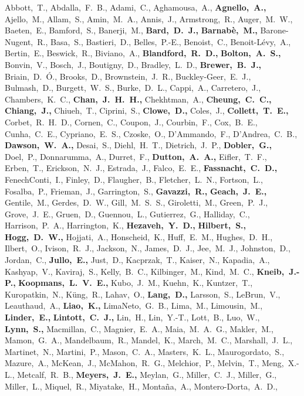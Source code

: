\scriptsize
Abbott,~T.,
Abdalla,~F.~B.,
Adami,~C.,
Aghamousa,~A.,
{\bf Agnello,~A.,}
Ajello,~M.,
Allam,~S.,
Amin,~M.~A.,
Annis,~J.,
Armstrong,~R.,
Auger,~M.~W.,
Baeten,~E.,
Bamford,~S.,
Banerji,~M.,
{\bf Bard,~D.~J.,}
{\bf Barnab\`{e},~M.,}
Barone-Nugent,~R.,
Basa,~S.,
Bastieri,~D.,
Belles,~P.-E.,
Benoist,~C.,
Benoit-L\'{e}vy,~A.,
Bertin,~E.,
Beswick,~R.,
Biviano,~A.,
{\bf Blandford,~R.~D.,}
{\bf Bolton,~A.~S.,}
Bonvin,~V.,
Bosch,~J.,
Boutigny,~D.,
Bradley,~L.~D.,
{\bf Brewer,~B.~J.,}
Briain,~D.~\'{O}.,
Brooks,~D.,
Brownstein,~J.~R.,
Buckley-Geer,~E.~J.,
Bulmash,~D.,
Burgett,~W.~S.,
Burke,~D.~L.,
Cappi,~A.,
Carretero,~J.,
Chambers,~K.~C.,
{\bf Chan,~J.~H.~H.,}
Chekhtman,~A.,
{\bf Cheung,~C.~C.,}
{\bf Chiang,~J.,}
Chiueh,~T.,
Ciprini,~S.,
{\bf Clowe,~D.,}
Coles,~J.,
{\bf Collett,~T.~E.,}
Corbet,~R.~H.~D.,
Cornen,~C.,
Coupon,~J.,
Courbin,~F.,
Cox,~B.~E.,
Cunha,~C.~E.,
Cypriano,~E.~S.,
Czoske,~O.,
D'Ammando,~F.,
D'Andrea,~C.~B.,
{\bf Dawson,~W.~A.,}
Desai,~S.,
Diehl,~H.~T.,
Dietrich,~J.~P.,
{\bf Dobler,~G.,}
Doel,~P.,
Donnarumma,~A.,
Durret,~F.,
{\bf Dutton,~A.~A.,}
Eifler,~T.~F.,
Erben,~T.,
Erickson,~N.~J.,
Estrada,~J.,
Falco,~E.~E.,
{\bf Fassnacht,~C.~D.,}
FenechConti,~I.,
Finley,~D.,
Flaugher,~B.,
Fletcher,~L.~N.,
Fortson,~L.,
Fosalba,~P.,
Frieman,~J.,
Garrington,~S.,
{\bf Gavazzi,~R.,}
{\bf Geach,~J.~E.,}
Gentile,~M.,
Gerdes,~D.~W.,
Gill,~M.~S.~S.,
Giroletti,~M.,
Green,~P.~J.,
Grove,~J.~E.,
Gruen,~D.,
Guennou,~L.,
Gutierrez,~G.,
Halliday,~C.,
Harrison,~P.~A.,
Harrington,~K.,
{\bf Hezaveh,~Y.~D.,}
{\bf Hilbert,~S.,}
{\bf Hogg,~D.~W.,}
Hojjati,~A.,
Honscheid,~K.,
Huff,~E.~M.,
Hughes,~D.~H.,
Ilbert,~O.,
Ivison,~R.~J.,
Jackson,~N.,
James,~D.~J.,
Jee,~M.~J.,
Johnston,~D.,
Jordan,~C.,
{\bf Jullo,~E.,}
Just,~D.,
Kacprzak,~T.,
Kaiser,~N.,
Kapadia,~A.,
Kashyap,~V.,
Kaviraj,~S.,
Kelly,~B.~C.,
Kilbinger,~M.,
Kind,~M.~C.,
{\bf Kneib,~J.-P.,}
{\bf Koopmans,~L.~V.~E.,}
Kubo,~J.~M.,
Kuehn,~K.,
Kuntzer,~T.,
Kuropatkin,~N.,
K\"{u}ng,~R.,
Lahav,~O.,
{\bf Lang,~D.,}
Larsson,~S.,
LeBrun,~V.,
Leauthaud,~A.,
{\bf Liao,~K.,}
LimaNeto,~G.~B.,
Lima,~M.,
Limousin,~M.,
{\bf Linder,~E.,}
{\bf Lintott,~C.~J.,}
Lin,~H.,
Lin,~Y.-T.,
Lott,~B.,
Luo,~W.,
{\bf Lynn,~S.,}
Macmillan,~C.,
Magnier,~E.~A.,
Maia,~M.~A.~G.,
Makler,~M.,
Mamon,~G.~A.,
Mandelbaum,~R.,
Mandel,~K.,
March,~M.~C.,
Marshall,~J.~L.,
Martinet,~N.,
Martini,~P.,
Mason,~C.~A.,
Masters,~K.~L.,
Maurogordato,~S.,
Mazure,~A.,
McKean,~J.,
McMahon,~R.~G.,
Melchior,~P.,
Melvin,~T.,
Meng,~X.-L.,
Metcalf,~R.~B.,
{\bf Meyers,~J.~E.,}
Meylan,~G.,
Miller,~C.~J.,
Miller,~G.,
Miller,~L.,
Miquel,~R.,
Miyatake,~H.,
Monta\~{n}a,~A.,
Montero-Dorta,~A.~D.,
